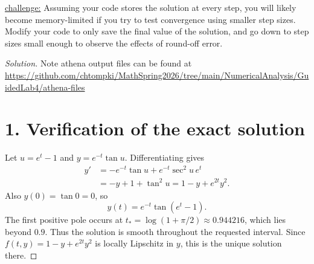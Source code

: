 \documentclass[12pt]{amsart}
\newenvironment{solution}
{\begin{proof}[Solution]}
{\end{proof}}
\begin{document}
\begin{onehalfspace}
\begin{enumerate}
            \vspace{2pt}
            \underline{challenge:} Assuming your code stores the solution at every step, you will likely
            become memory-limited if you try to test convergence using smaller step sizes.
            Modify your code to only save the final value of the solution, and go down to step
            sizes small enough to observe the effects of round-off error.
        \end{enumerate}

        \begin{solution}
            Note athena output files can be found at \underline{https://github.com/chtompki/MathSpring2026/tree/main/NumericalAnalysis/GuidedLab4/athena-files}
            \section*{1. Verification of the exact solution}
            Let $u=e^t-1$ and $y=e^{-t}\tan u$. Differentiating gives
            \begin{align*}
                y'&=-e^{-t}\tan u+e^{-t}\sec^2u\,e^t\\
                &=-y+1+\tan^2u=1-y+e^{2t}y^2.
            \end{align*}
            Also $y(0)=\tan 0=0$, so
            \[
                \boxed{y(t)=e^{-t}\tan(e^t-1).}
            \]
            The first positive pole occurs at $t_* = \log(1+\pi/2)\approx0.944216$,
            which lies beyond $0.9$. Thus the solution is smooth throughout the
            requested interval. Since $f(t,y)=1-y+e^{2t}y^2$ is locally Lipschitz in
            $y$, this is the unique solution there.


\end{solution}
\end{onehalfspace}
\end{document}
